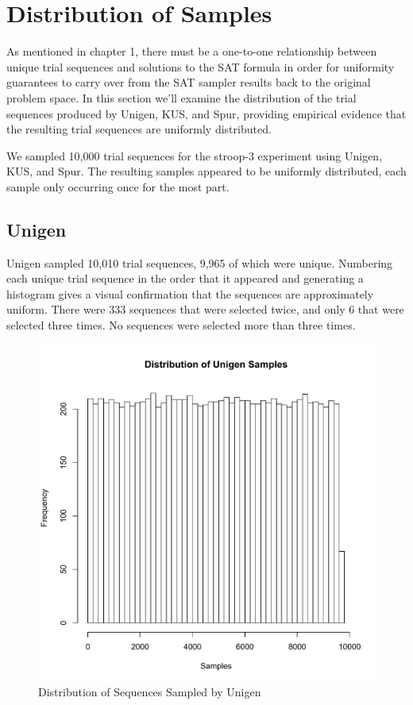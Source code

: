 \section{Distribution of Samples}

As mentioned in chapter 1, there must be a one-to-one relationship between unique trial sequences and solutions to the SAT formula in order for uniformity guarantees to carry over from the SAT sampler results back to the original problem space. In this section we'll examine the distribution of the trial sequences produced by Unigen, KUS, and Spur, providing empirical evidence that the resulting trial sequences are uniformly distributed.

We sampled 10,000 trial sequences for the stroop-3 experiment using Unigen, KUS, and Spur. The resulting samples appeared to be uniformly distributed, each sample only occurring once for the most part.

\subsection{Unigen}

Unigen sampled 10,010 trial sequences, 9,965 of which were unique. Numbering each unique trial sequence in the order that it appeared and generating a histogram gives a visual confirmation that the sequences are approximately uniform. There were 333 sequences that were selected twice, and only 6 that were selected three times. No sequences were selected more than three times.

\begin{figure}[htb]
\centering
\centerline{\includegraphics[origin=c,width=12cm]{../figures/unigen-samples.pdf}}
\caption{Distribution of Sequences Sampled by Unigen}
\label{fig:unigen_samples}
\end{figure}


